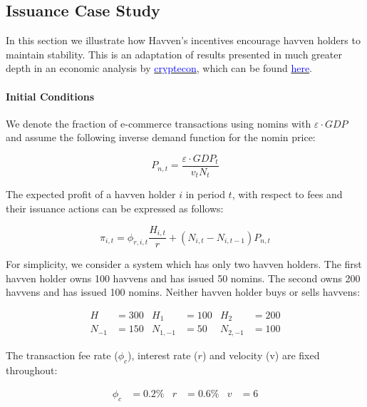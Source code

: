 \newpage

\subsection{Issuance Case Study} In this section we illustrate how Havven's
incentives encourage havven holders to maintain stability. This is an adaptation
of results presented in much greater depth in an economic analysis by \href{http://cryptecon.org/}{\textcolor{blue}{cryptecon}},
which can be found \href{https://havven.io/uploads/havven_cryptecon_report_may_2018.pdf}{\textcolor{blue}{here}}.

\paragraph {Initial Conditions}
\noindent We denote the fraction of e-commerce transactions using nomins with $\varepsilon \cdot GDP$ and
assume the following inverse demand function for the nomin price:

\begin{equation*} \label{eq:nominprice} P_{n,t} = \frac{\varepsilon \cdot GDP_t}{v_tN_t} \end{equation*}

\noindent The expected profit of a havven holder \(i\) in period \(t\), with
respect to fees and their issuance actions can be expressed as follows:

\begin{equation*} 
\pi_{i,t} = \phi_{r,i,t} \frac{H_{i,t}}{r} + (N_{i,t} - N_{i,t-1}) P_{n,t} \label{eq:profit}
\end{equation*}


\noindent For simplicity, we consider a system which
has only two havven holders. The first havven holder owns 100 havvens and has
issued 50 nomins. The second owns 200 havvens and has issued 100 nomins.
Neither havven holder buys or sells havvens:

\begin{align*}
H &= 300 & H_1 &= 100 & H_2 &= 200 \\
N_{-1} &= 150 & N_{1,-1} &= 50 & N_{2,-1} &= 100
\end{align*}

\noindent The transaction fee rate (\(\phi_c\)), interest rate (\(r\)) and
velocity (v) are fixed throughout:

\begin{align*}
\phi_c &= 0.2\% & r &= 0.6\%  & v &= 6
\end{align*}

